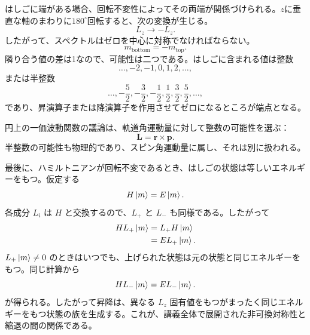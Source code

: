 \begin{classroomqa}
\end{classroomqa}

はしごに端がある場合、回転不変性によってその両端が関係づけられる。\(z\)に垂直な軸のまわりに\(180^\circ\)回転すると、次の変換が生じる。
\begin{equation}
L_z\longrightarrow-L_z.
\end{equation}
したがって、スペクトルはゼロを中心に対称でなければならない。
\begin{equation}
m_{\mathrm{bottom}}=-m_{\mathrm{top}}.
\end{equation}
隣り合う値の差は1なので、可能性は二つである。はしごに含まれる値は整数
\begin{equation}
\ldots,-2,-1,0,1,2,\ldots,
\end{equation}
または半整数
\begin{equation}
\ldots,-\frac{5}{2},-\frac{3}{2},-\frac{1}{2},
\frac{1}{2},\frac{3}{2},\frac{5}{2},\ldots,
\end{equation}
であり、昇演算子または降演算子を作用させてゼロになるところが端点となる。

円上の一価波動関数の議論は、軌道角運動量に対して整数の可能性を選ぶ：
\begin{equation}
\mathbf L=\mathbf r\times\mathbf p.
\end{equation}
半整数の可能性も物理的であり、スピン角運動量に属し、それは別に扱われる。

最後に、ハミルトニアンが回転不変であるとき、はしごの状態は等しいエネルギーをもつ。仮定する
\begin{equation}
H\left\lvert m\right\rangle=E\left\lvert m\right\rangle.
\end{equation}
各成分 \(L_i\) は \(H\) と交換するので、\(L_+\) と \(L_-\) も同様である。したがって
\begin{align}
H L_+\left\lvert m\right\rangle
&=L_+H\left\lvert m\right\rangle\\
&=E L_+\left\lvert m\right\rangle.
\end{align}
\(L_+\left\lvert m\right\rangle\neq0\) のときはいつでも、上げられた状態は元の状態と同じエネルギーをもつ。同じ計算から
\begin{equation}
H L_-\left\lvert m\right\rangle=E L_-\left\lvert m\right\rangle.
\end{equation}
が得られる。したがって昇降は、異なる \(L_z\) 固有値をもつがまったく同じエネルギーをもつ状態の族を生成する。これが、講義全体で展開された非可換対称性と縮退の間の関係である。

